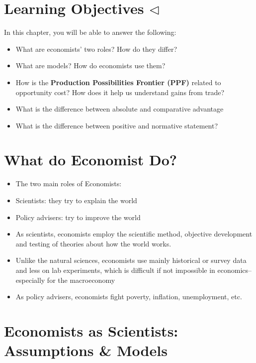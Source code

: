 \documentclass[
]{book}
\begin{document}
\hypertarget{learning-objectives-triangleleft}{%
\section{\texorpdfstring{Learning Objectives \(\triangleleft\)}{Learning Objectives \textbackslash triangleleft}}\label{learning-objectives-triangleleft}}

In this chapter, you will be able to answer the following:

\begin{itemize}
\item
  What are economists' two roles? How do they differ?
\item
  What are models? How do economists use them?
\item
  How is the \textbf{Production Possibilities Frontier (PPF)} related to opportunity cost? How does it help us understand gains from trade?
\item
  What is the difference between absolute and comparative advantage
\item
  What is the difference between positive and normative statement?
\end{itemize}

\hypertarget{what-do-economist-do}{%
\section{What do Economist Do?}\label{what-do-economist-do}}

\begin{itemize}
\item
  The two main roles of Economists:
\item
  Scientists: they try to explain the world
\item
  Policy advisers: try to improve the world
\item
  As scientists, economists employ the scientific method, objective development and testing of theories about how the world works.
\item
  Unlike the natural sciences, economists use mainly historical or survey data and less on lab experiments, which is difficult if not impossible in economics-- especially for the macroeconomy
\item
  As policy advisers, economists fight poverty, inflation, unemployment, etc.
\end{itemize}

\hypertarget{economists-as-scientists-assumptions-models}{%
\section{Economists as Scientists: Assumptions \& Models}\label{economists-as-scientists-assumptions-models}}
\end{document}
